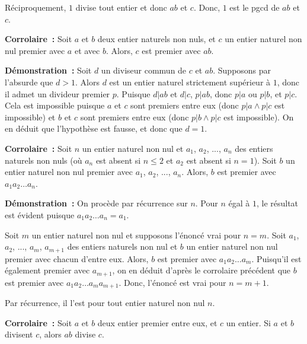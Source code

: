 Réciproquement, $1$ divise tout entier et donc $ab$ et $c$.
Donc, $1$ est le pgcd de $ab$ et $c$.

\done

\medskip 

\noindent\textbf{Corrolaire :} Soit $a$ et $b$ deux entier naturels non nuls, et $c$ un entier naturel non nul premier avec $a$ et avec $b$. 
Alors, $c$ est premier avec $ab$.

\medskip

\noindent\textbf{Démonstration :}
    Soit $d$ un diviseur commun de $c$ et $a b$. 
    Supposons par l'absurde que $d > 1$.
    Alors $d$ est un entier naturel strictement supérieur à $1$, donc il admet un divideur premier $p$. 
    Puisque $d \vert ab$ et $d \vert c$, $p \vert ab$, donc $p \vert a$ ou $p \vert b$, et $p \vert c$. 
    Cela est impossible puisque $a$ et $c$ sont premiers entre eux (donc $p \vert a \wedge p \vert c$ est impossible) et $b$ et $c$ sont premiers entre eux (donc $p \vert b \wedge p \vert c$ est impossible). 
    On en déduit que l'hypothèse est fausse, et donc que $d=1$.
    
    \done

\medskip 

\noindent\textbf{Corrolaire :} Soit $n$ un entier naturel non nul et $a_1$, $a_2$, ..., $a_n$ des entiers naturels non nuls (où $a_n$ est absent si $n \leq 2$ et $a_2$ est absent si $n = 1$). 
    Soit $b$ un entier naturel non nul premier avec $a_1$, $a_2$, ..., $a_n$.
    Alors, $b$ est premier avec $a_1 a_2 \dots a_n$.

\medskip

\noindent\textbf{Démonstration :}
    On procède par récurrence sur $n$. 
    Pour $n$ égal à $1$, le résultat est évident puisque $a_1 a_2 \dots a_n = a_1$.

    Soit $m$ un entier naturel non nul et supposons l'énoncé vrai pour $n = m$.
    Soit $a_1$, $a_2$, ..., $a_m$, $a_{m+1}$ des entiers naturels non nul et $b$ un entier naturel non nul premier avec chacun d'entre eux.
    Alors, $b$ est premier avec $a_1 a_2 \dots a_m$. 
    Puisqu'il est également premier avec $a_{m+1}$, on en déduit d'après le corrolaire précédent que $b$ est premier avec $a_1 a_2 \dots a_m a_{m+1}$.
    Donc, l'énoncé est vrai pour $n = m+1$. 
    
    Par récurrence, il l'est pour tout entier naturel non nul $n$.

    \done

\medskip 

\noindent\textbf{Corrolaire :} Soit $a$ et $b$ deux entier premier entre eux, et $c$ un entier. Si $a$ et $b$ divisent $c$, alors $ab$ divise $c$.

